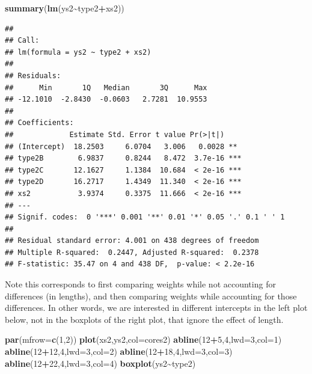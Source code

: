 \documentclass[
]{book}
\newenvironment{Shaded}{\begin{snugshade}}{\end{snugshade}}
\newcommand{\AttributeTok}[1]{\textcolor[rgb]{0.13,0.29,0.53}{#1}}
\newcommand{\DecValTok}[1]{\textcolor[rgb]{0.00,0.00,0.81}{#1}}
\newcommand{\FunctionTok}[1]{\textcolor[rgb]{0.13,0.29,0.53}{\textbf{#1}}}
\newcommand{\NormalTok}[1]{#1}
\newcommand{\SpecialCharTok}[1]{\textcolor[rgb]{0.81,0.36,0.00}{\textbf{#1}}}
\begin{document}
\begin{Shaded}
\begin{Highlighting}[]
\FunctionTok{summary}\NormalTok{(}\FunctionTok{lm}\NormalTok{(ys2}\SpecialCharTok{\textasciitilde{}}\NormalTok{type2}\SpecialCharTok{+}\NormalTok{xs2))}
\end{Highlighting}
\end{Shaded}

\begin{verbatim}
## 
## Call:
## lm(formula = ys2 ~ type2 + xs2)
## 
## Residuals:
##      Min       1Q   Median       3Q      Max 
## -12.1010  -2.8430  -0.0603   2.7281  10.9553 
## 
## Coefficients:
##             Estimate Std. Error t value Pr(>|t|)    
## (Intercept)  18.2503     6.0704   3.006   0.0028 ** 
## type2B        6.9837     0.8244   8.472  3.7e-16 ***
## type2C       12.1627     1.1384  10.684  < 2e-16 ***
## type2D       16.2717     1.4349  11.340  < 2e-16 ***
## xs2           3.9374     0.3375  11.666  < 2e-16 ***
## ---
## Signif. codes:  0 '***' 0.001 '**' 0.01 '*' 0.05 '.' 0.1 ' ' 1
## 
## Residual standard error: 4.001 on 438 degrees of freedom
## Multiple R-squared:  0.2447, Adjusted R-squared:  0.2378 
## F-statistic: 35.47 on 4 and 438 DF,  p-value: < 2.2e-16
\end{verbatim}

Note this corresponds to first comparing weights while not accounting for differences (in lengths), and then comparing weights while accounting for those differences. In other words, we are interested in different intercepts in the left plot below, not in the boxplots of the right plot, that ignore the effect of length.

\begin{Shaded}
\begin{Highlighting}[]
\FunctionTok{par}\NormalTok{(}\AttributeTok{mfrow=}\FunctionTok{c}\NormalTok{(}\DecValTok{1}\NormalTok{,}\DecValTok{2}\NormalTok{))}
\FunctionTok{plot}\NormalTok{(xs2,ys2,}\AttributeTok{col=}\NormalTok{cores2)}
\FunctionTok{abline}\NormalTok{(}\DecValTok{12}\SpecialCharTok{+}\DecValTok{5}\NormalTok{,}\DecValTok{4}\NormalTok{,}\AttributeTok{lwd=}\DecValTok{3}\NormalTok{,}\AttributeTok{col=}\DecValTok{1}\NormalTok{)}
\FunctionTok{abline}\NormalTok{(}\DecValTok{12}\SpecialCharTok{+}\DecValTok{12}\NormalTok{,}\DecValTok{4}\NormalTok{,}\AttributeTok{lwd=}\DecValTok{3}\NormalTok{,}\AttributeTok{col=}\DecValTok{2}\NormalTok{)}
\FunctionTok{abline}\NormalTok{(}\DecValTok{12}\SpecialCharTok{+}\DecValTok{18}\NormalTok{,}\DecValTok{4}\NormalTok{,}\AttributeTok{lwd=}\DecValTok{3}\NormalTok{,}\AttributeTok{col=}\DecValTok{3}\NormalTok{)}
\FunctionTok{abline}\NormalTok{(}\DecValTok{12}\SpecialCharTok{+}\DecValTok{22}\NormalTok{,}\DecValTok{4}\NormalTok{,}\AttributeTok{lwd=}\DecValTok{3}\NormalTok{,}\AttributeTok{col=}\DecValTok{4}\NormalTok{)}
\FunctionTok{boxplot}\NormalTok{(ys2}\SpecialCharTok{\textasciitilde{}}\NormalTok{type2)}
\end{Highlighting}
\end{Shaded}
\end{document}
